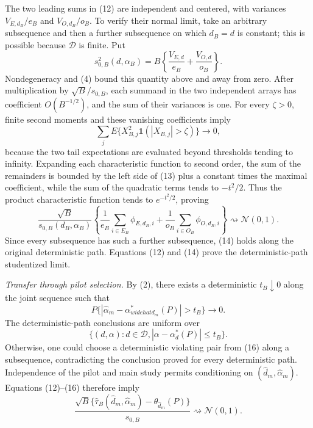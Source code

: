 The two leading sums in (12) are independent and centered, with variances \(V_{E,d_B}/e_B\) and \(V_{O,d_B}/o_B\).  To verify their normal limit, take an arbitrary subsequence and then a further subsequence on which \(d_B=d\) is constant; this is possible because \(\mathcal D\) is finite.  Put
\[
 s_{0,B}^2(d,\alpha_B)
 =B\left\{\frac{V_{E,d}}{e_B}+\frac{V_{O,d}}{o_B}\right\}.
\]
Nondegeneracy and (4) bound this quantity above and away from zero.  After multiplication by \(\sqrt B/s_{0,B}\), each summand in the two independent arrays has coefficient \(O(B^{-1/2})\), and the sum of their variances is one.  For every \(\zeta>0\), finite second moments and these vanishing coefficients imply
\[
 \sum_j E\{X_{B,j}^2\mathbf1(|X_{B,j}|>\zeta)\}\longrightarrow0, \tag{13}
\]
because the two tail expectations are evaluated beyond thresholds tending to infinity.  Expanding each characteristic function to second order, the sum of the remainders is bounded by the left side of (13) plus a constant times the maximal coefficient, while the sum of the quadratic terms tends to \(-t^2/2\).  Thus the product characteristic function tends to \(e^{-t^2/2}\), proving
\[
 \frac{\sqrt B}{s_{0,B}(d_B,\alpha_B)}
 \left\{
 \frac1{e_B}\sum_{i\in E_B}\phi_{E,d_B,i}
 +\frac1{o_B}\sum_{i\in O_B}\phi_{O,d_B,i}
 \right\}
 \rightsquigarrow\mathcal N(0,1).                             \tag{14}
\]
Since every subsequence has such a further subsequence, (14) holds along the original deterministic path.  Equations (12) and (14) prove the deterministic-path studentized limit.

\emph{Transfer through pilot selection.}
By (2), there exists a deterministic \(t_B\downarrow0\) along the joint sequence such that
\[
 P\{|\widehat\alpha_m-\alpha_{widehat d_m}^*(P)|>t_B\}
 \longrightarrow0.                                           \tag{15}
\]
The deterministic-path conclusions are uniform over
\[
 \{(d,\alpha):d\in\mathcal D,
 |\alpha-\alpha_d^*(P)|\le t_B\}.                             \tag{16}
\]
Otherwise, one could choose a deterministic violating pair from (16) along a subsequence, contradicting the conclusion proved for every deterministic path.  Independence of the pilot and main study permits conditioning on \((\widehat d_m,\widehat\alpha_m)\).  Equations (12)--(16) therefore imply
\[
 \frac{\sqrt B\{\widehat\tau_B(\widehat d_m,\widehat\alpha_m)
 -\theta_{\widehat d_m}(P)\}}{s_{0,B}}
 \rightsquigarrow\mathcal N(0,1).                             \tag{17}
\]

